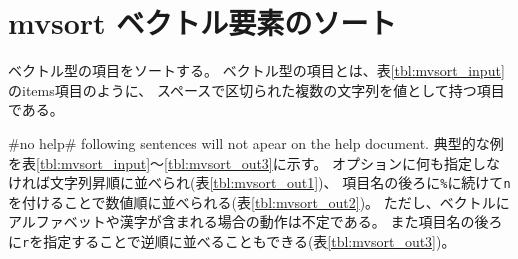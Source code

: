 
%

\section{mvsort ベクトル要素のソート\label{sect:mvsort}}
ベクトル型の項目をソートする。
ベクトル型の項目とは、表\ref{tbl:mvsort_input}のitems項目のように、
スペースで区切られた複数の文字列を値として持つ項目である。

 #no help# following sentences will not apear on the help document. \fi
典型的な例を表\ref{tbl:mvsort_input}〜\ref{tbl:mvsort_out3}に示す。
オプションに何も指定しなければ文字列昇順に並べられ(表\ref{tbl:mvsort_out1})、
項目名の後ろに\verb|%|に続けて\verb|n|を付けることで数値順に並べられる(表\ref{tbl:mvsort_out2})。
ただし、ベクトルにアルファベットや漢字が含まれる場合の動作は不定である。
また項目名の後ろに\verb|r|を指定することで逆順に並べることもできる(表\ref{tbl:mvsort_out3})。

